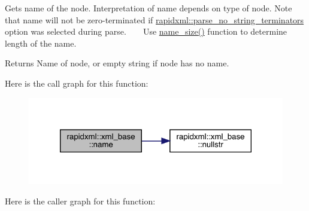 Gets name of the node. Interpretation of name depends on type of node. Note that name will not be zero-\/terminated if \mbox{\hyperlink{namespacerapidxml_af3fc88ba6bee33482a2db81b1da36ea1}{rapidxml\+::parse\+\_\+no\+\_\+string\+\_\+terminators}} option was selected during parse. ~\newline
~\newline
 Use \mbox{\hyperlink{classrapidxml_1_1xml__base_a20c8ffbe0c7a0b4231681ab8b99330a4}{name\+\_\+size()}} function to determine length of the name. \begin{DoxyReturn}{Returns}
Name of node, or empty string if node has no name. 
\end{DoxyReturn}
Here is the call graph for this function\+:\nopagebreak
\begin{figure}[H]
\begin{center}
\leavevmode
\includegraphics[width=320pt]{classrapidxml_1_1xml__base_aef8ae147fbee59209f714274afc80dc4_cgraph}
\end{center}
\end{figure}
Here is the caller graph for this function\+:\nopagebreak
